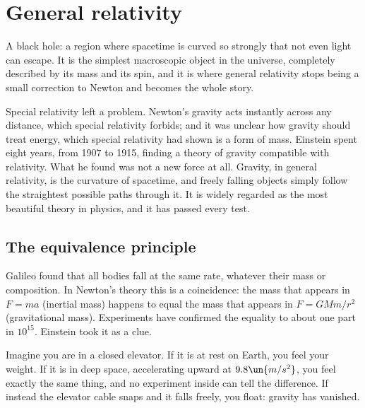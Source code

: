 \chapter{General relativity}
\label{ch:gr}



\begin{prototype}
A black hole: a region where spacetime is curved so strongly that not even light can escape. It is the simplest macroscopic object in the universe, completely described by its mass and its spin, and it is where general relativity stops being a small correction to Newton and becomes the whole story.
\end{prototype}

Special relativity left a problem. Newton's gravity acts instantly across any distance, which special relativity forbids; and it was unclear how gravity should treat energy, which special relativity had shown is a form of mass. Einstein spent eight years, from 1907 to 1915, finding a theory of gravity compatible with relativity. What he found was not a new force at all. Gravity, in general relativity, is the curvature of spacetime, and freely falling objects simply follow the straightest possible paths through it. It is widely regarded as the most beautiful theory in physics, and it has passed every test.

\section{The equivalence principle}

Galileo found that all bodies fall at the same rate, whatever their mass or composition. In Newton's theory this is a coincidence: the mass that appears in $F = ma$ (inertial mass) happens to equal the mass that appears in $F = GMm/r^2$ (gravitational mass). Experiments have confirmed the equality to about one part in $10^{15}$. Einstein took it as a clue.

Imagine you are in a closed elevator. If it is at rest on Earth, you feel your weight. If it is in deep space, accelerating upward at $9.8\un{m/s^2}$, you feel exactly the same thing, and no experiment inside can tell the difference. If instead the elevator cable snaps and it falls freely, you float: gravity has vanished.

